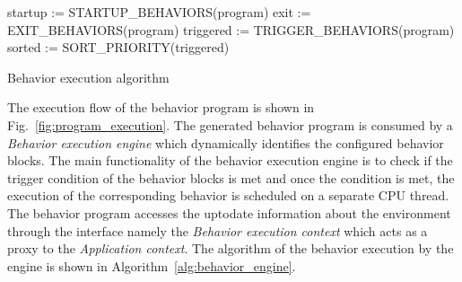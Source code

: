 \begin{algorithm}[H]
 startup := STARTUP\_BEHAVIORS(program)\;
 exit := EXIT\_BEHAVIORS(program)\;
 triggered := TRIGGER\_BEHAVIORS(program)\;
 sorted := SORT\_PRIORITY(triggered)\;
 \caption{Behavior execution algorithm}
 \label{alg:behavior_engine}
\end{algorithm}
 The execution flow of the behavior program is shown in Fig.~\ref{fig:program_execution}. The generated behavior program is consumed by a \emph{Behavior execution engine} which dynamically identifies the configured behavior blocks. The main functionality of the behavior execution engine is to check if the trigger condition of the behavior blocks is met and once the condition is met, the execution of the corresponding behavior is scheduled on a separate CPU thread. The behavior program accesses the uptodate information about the environment through the interface namely the \emph{Behavior execution context} which acts as a proxy to the \emph{Application context}. The algorithm of the behavior execution by the engine is shown in Algorithm~\ref{alg:behavior_engine}.
